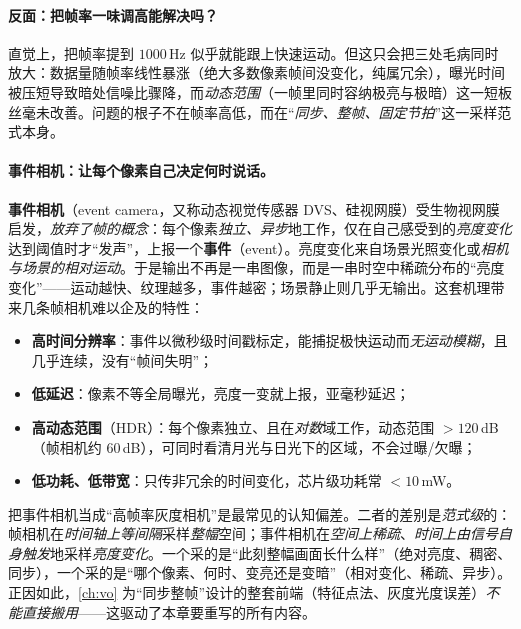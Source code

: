 \paragraph{反面：把帧率一味调高能解决吗？}
直觉上，把帧率提到 $1000$\,Hz 似乎就能跟上快速运动。但这只会把三处毛病同时放大：数据量随帧率线性暴涨（绝大多数像素帧间没变化，纯属冗余），曝光时间被压短导致暗处信噪比骤降，而\emph{动态范围}（一帧里同时容纳极亮与极暗）这一短板丝毫未改善。问题的根子不在帧率高低，而在“\emph{同步、整帧、固定节拍}”这一采样范式本身。

\paragraph{事件相机：让每个像素自己决定何时说话。}
\textbf{事件相机}（event camera，又称动态视觉传感器 DVS、硅视网膜）受生物视网膜启发，\emph{放弃了帧的概念}\cite{gallego2022eventsurvey}：每个像素\emph{独立、异步}地工作，仅在自己感受到的\emph{亮度变化}达到阈值时才“发声”，上报一个\textbf{事件}（event）。亮度变化来自场景光照变化或\emph{相机与场景的相对运动}。于是输出不再是一串图像，而是一串时空中稀疏分布的“亮度变化”——运动越快、纹理越多，事件越密；场景静止则几乎无输出。这套机理带来几条帧相机难以企及的特性\cite{gallego2022eventsurvey}：

\begin{itemize}
  \item \textbf{高时间分辨率}：事件以微秒级时间戳标定，能捕捉极快运动而\emph{无运动模糊}，且几乎连续，没有“帧间失明”；
  \item \textbf{低延迟}：像素不等全局曝光，亮度一变就上报，亚毫秒延迟；
  \item \textbf{高动态范围}（HDR）：每个像素独立、且在\emph{对数}域工作，动态范围 $>120$\,dB（帧相机约 $60$\,dB），可同时看清月光与日光下的区域，不会过曝/欠曝；
  \item \textbf{低功耗、低带宽}：只传非冗余的时间变化，芯片级功耗常 $<10$\,mW。
\end{itemize}

\begin{insight}
把事件相机当成“高帧率灰度相机”是最常见的认知偏差。二者的差别是\emph{范式级}的：帧相机在\emph{时间轴上等间隔}采样\emph{整幅}空间；事件相机在\emph{空间上稀疏}、\emph{时间上由信号自身触发}地采样\emph{亮度变化}。一个采的是“此刻整幅画面长什么样”（绝对亮度、稠密、同步），一个采的是“哪个像素、何时、变亮还是变暗”（相对变化、稀疏、异步）。正因如此，\cref{ch:vo} 为“同步整帧”设计的整套前端（特征点法、灰度光度误差）\emph{不能直接搬用}——这驱动了本章要重写的所有内容。
\end{insight}

